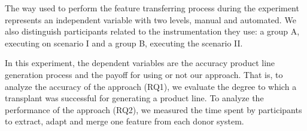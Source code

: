 
The way used to perform the feature transferring process during the experiment represents an independent variable with two levels, manual and automated. We also distinguish participants related to the instrumentation they use: a group A, executing on scenario I and a group B, executing the scenario II. 

In this experiment, the dependent variables are the accuracy product line generation process and the payoff for using or not our approach. That is, to analyze the accuracy of the approach (RQ1), we evaluate the degree to which a transplant was successful for generating a product line. To analyze the performance of the approach (RQ2), we measured the time spent by participants to extract, adapt and merge one feature from each donor system. 












